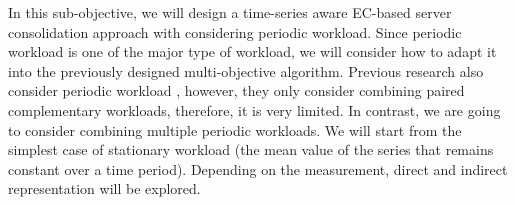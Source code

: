 \begin{enumerate}
	In this sub-objective, we will design a time-series aware EC-based server consolidation approach with considering periodic workload. Since periodic workload is one of the major type of workload, we will consider how to adapt it into the previously designed multi-objective algorithm. Previous research also consider periodic workload \cite{Meng:2010gh}, however, they only consider combining paired complementary workloads, therefore, it is very limited. In contrast, we are going to consider combining multiple periodic workloads. We will start from the simplest case of  stationary workload (the mean value of the series that remains constant over a time period). Depending on the measurement, direct and indirect representation will be explored. 





	

	

	\end{enumerate}

